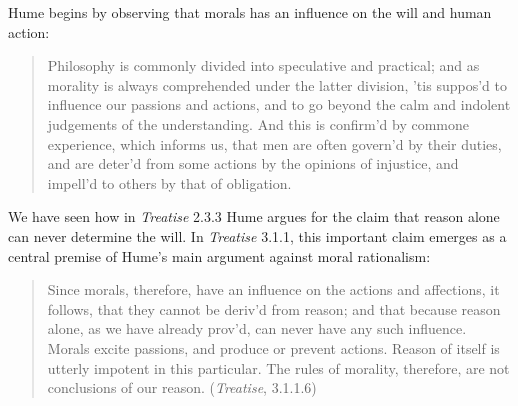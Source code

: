 
Hume begins by observing that morals has an influence on the will and human action:

\begin{quote}
    Philosophy is commonly divided into speculative and practical; and as morality is always comprehended under the latter division, 'tis suppos'd to influence our passions and actions, and to go beyond the calm and indolent judgements of the understanding. And this is confirm'd by commone experience, which informs us, that men are often govern'd by their duties, and are deter'd from some actions by the opinions of injustice, and impell'd to others by that of obligation.
\end{quote}

We have seen how in \emph{Treatise} 2.3.3 Hume argues for the claim that reason alone can never determine the will. In \emph{Treatise} 3.1.1, this important claim emerges as a central premise of Hume's main argument against moral rationalism:

\begin{quote}
    Since morals, therefore, have an influence on the actions and affections, it follows, that they cannot be deriv'd from reason; and that because reason alone, as we have already prov'd, can never have any such influence. Morals excite passions, and produce or prevent actions. Reason of itself is utterly impotent in this particular. The rules of morality, therefore, are not conclusions of our reason. (\emph{Treatise}, 3.1.1.6)
\end{quote}


